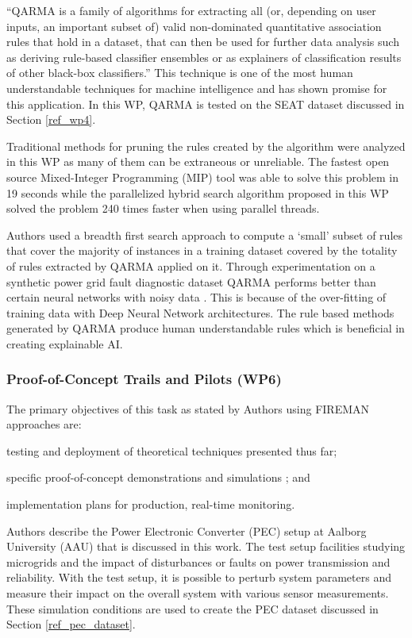 \enquote{QARMA is a family of algorithms for extracting all (or, depending on user inputs, an important subset of) valid non-dominated quantitative association rules that hold in a dataset, that can then be used for further data analysis such as deriving rule-based classifier ensembles or as explainers of classification results of other black-box classifiers.}  This technique is one of the most human understandable techniques for machine intelligence and has shown promise for this application. In this WP, QARMA is tested on the SEAT dataset discussed in Section \ref{ref_wp4}.

Traditional methods for pruning the rules created by the algorithm were analyzed in this WP as many of them can be extraneous or unreliable. The fastest open source Mixed-Integer Programming (MIP) tool was able to solve this problem in 19 seconds while the parallelized hybrid search algorithm proposed in this WP solved the problem 240 times faster when using parallel threads.

Authors \cite{wp5.1} used a breadth first search approach to compute a `small' subset of rules that cover the majority of instances in a training dataset covered by the totality of rules extracted by QARMA applied on it. Through experimentation on a synthetic power grid fault diagnostic dataset QARMA performs better than certain neural networks with noisy data \parencite{ml-performance-power-trans}. This is because of the over-fitting of training data with Deep Neural Network architectures. The rule based methods generated by QARMA produce human understandable rules which is beneficial in creating explainable AI.

\subsubsection{Proof-of-Concept Trails and Pilots (WP6)}
\label{ref_wp6}

The primary objectives of this task as stated by Authors \parencite{wp6.1} using FIREMAN approaches are:
\begin{inlinelist}
    \item testing and deployment of theoretical techniques presented thus far;
    \item specific proof-of-concept demonstrations and simulations ; and
    \item implementation plans for production, real-time monitoring.
\end{inlinelist}

Authors \parencite{wp6.3} describe the Power Electronic Converter (PEC) setup at Aalborg University (AAU) that is discussed in this work. The test setup facilities studying microgrids and the impact of disturbances or faults on power transmission and reliability. With the test setup, it is possible to perturb system parameters and measure their impact on the overall system with various sensor measurements. These simulation conditions are used to create the PEC dataset discussed in Section \ref{ref_pec_dataset}.

